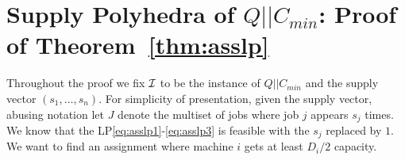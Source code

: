 \section{Supply Polyhedra of $Q||C_{min}$: Proof of Theorem~\ref{thm:asslp}}\label{sec:asslp}
\def\pv{\mathbf{b}}
\newcommand{\dem}{\mathsf{cap}}
  Throughout the proof we fix ${\cal I}$ to be the instance of $Q||C_{min}$ %
  and the supply vector $(s_1,\ldots,s_n)$. For simplicity of presentation, given the supply vector, abusing notation let $J$ denote the multiset of jobs where job $j$ appears $s_j$ times. We know that the LP\eqref{eq:asslp1}-\eqref{eq:asslp3} is feasible with the $s_j$ replaced by $1$. %
  We want to find an assignment where machine $i$ gets at least $D_i/2$ capacity. 
%
